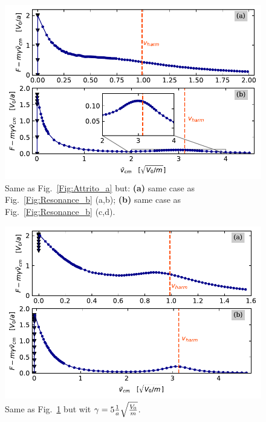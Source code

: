 \begin{figure}
\begin{center}
    \centering
    \includegraphics[width=1\linewidth]{Images/Attrito_2_b.pdf}
    \caption{Same as Fig.~\ref{Fig:Attrito_a} but: \textbf{(a)} same case as Fig.~\ref{Fig:Resonance_b} (a,b); \textbf{(b)} same case as Fig.~\ref{Fig:Resonance_b} (c,d).}
    \label{Fig:Attrito_b}
\end{center}
\end{figure}

\begin{figure}
\begin{center}
    \centering
    \includegraphics[width=1\linewidth]{Images/Attrito_b_2.pdf}
    \caption{Same as Fig.~\ref{Fig:Attrito_b} but wit $\gamma = 5 \frac{1}{a}\sqrt{\frac{V_0}{m}}$.}
    \label{Fig:Attrito_5_b}
\end{center}
\end{figure}

